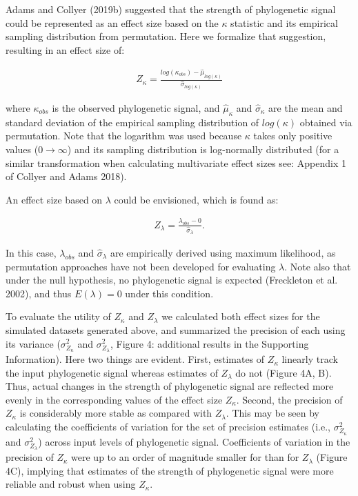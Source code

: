 \documentclass[]{article}
\begin{document}
Adams and Collyer (2019b) suggested that the strength of phylogenetic
signal could be represented as an effect size based on the \(\kappa\)
statistic and its empirical sampling distribution from permutation. Here
we formalize that suggestion, resulting in an effect size of:

\begin{align}
    Z_\kappa=\frac{log(\kappa_{obs})-\hat\mu_{log(\kappa)}}{\hat\sigma_{log(\kappa)}}
\end{align}

where \(\kappa_{obs}\) is the observed phylogenetic signal, and
\(\hat\mu_\kappa\) and \(\hat\sigma_\kappa\) are the mean and standard
deviation of the empirical sampling distribution of \(log(\kappa)\)
obtained via permutation. Note that the logarithm was used because
\(\kappa\) takes only positive values (\(0\to\infty\)) and its sampling
distribution is log-normally distributed (for a similar transformation
when calculating multivariate effect sizes see: Appendix 1 of Collyer
and Adams 2018). \hfill\break

An effect size based on \(\lambda\) could be envisioned, which is found
as:

\begin{align}
    Z_{\lambda}=\frac{\lambda_{obs}-0}{\hat\sigma_\lambda}.
\end{align}

In this case, \(\lambda_{obs}\) and \(\hat\sigma_\lambda\) are
empirically derived using maximum likelihood, as permutation approaches
have not been developed for evaluating \(\lambda\). Note also that under
the null hypothesis, no phylogenetic signal is expected (Freckleton et
al. 2002), and thus \(E(\lambda)=0\) under this condition. \hfill\break

To evaluate the utility of \(Z_\kappa\) and \(Z_\lambda\) we calculated
both effect sizes for the simulated datasets generated above, and
summarized the precision of each using its variance
(\(\sigma^2_{Z_\kappa}\) and \(\sigma^2_{Z_\lambda}\), Figure 4:
additional results in the Supporting Information). Here two things are
evident. First, estimates of \(Z_\kappa\) linearly track the input
phylogenetic signal whereas estimates of \(Z_\lambda\) do not (Figure
4A, B). Thus, actual changes in the strength of phylogenetic signal are
reflected more evenly in the corresponding values of the effect size
\(Z_\kappa\). Second, the precision of \(Z_\kappa\) is considerably more
stable as compared with \(Z_\lambda\). This may be seen by calculating
the coefficients of variation for the set of precision estimates (i.e.,
\(\sigma^2_{Z_\kappa}\) and \(\sigma^2_{Z_\lambda}\)) across input
levels of phylogenetic signal. Coefficients of variation in the
precision of \(Z_\kappa\) were up to an order of magnitude smaller for
than for \(Z_\lambda\) (Figure 4C), implying that estimates of the
strength of phylogenetic signal were more reliable and robust when using
\(Z_\kappa\). \hfill\break
\end{document}

